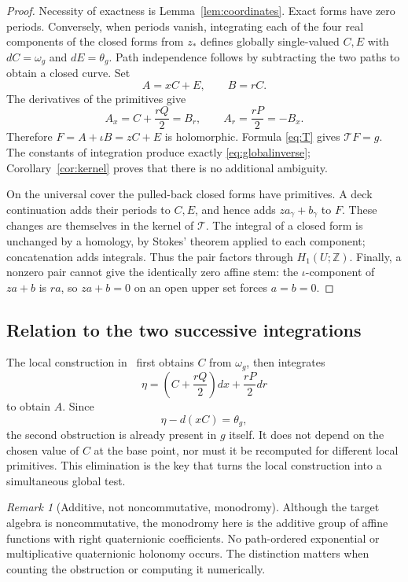 \documentclass[11pt,a4paper]{article}
\numberwithin{equation}{section}
\theoremstyle{definition}
\theoremstyle{remark}
\newtheorem{remark}[theorem]{Remark}
\newcommand{\T}{\mathcal T}
\begin{document}
\begin{proof}
Necessity of exactness is Lemma~\ref{lem:coordinates}. Exact forms have zero
periods. Conversely, when periods vanish, integrating each of the four real
components of the closed forms from $z_*$ defines globally single-valued
$C,E$ with $dC=\omega_g$ and $dE=\theta_g$. Path independence follows by
subtracting the two paths to obtain a closed curve. Set
\[
 A=xC+E,\qquad B=rC.
\]
The derivatives of the primitives give
\[
 A_x=C+\frac{rQ}{2}=B_r,\qquad
 A_r=\frac{rP}{2}=-B_x.
\]
Therefore $F=A+\iota B=zC+E$ is holomorphic. Formula \eqref{eq:T} gives
$\T F=g$. The constants of integration produce exactly
\eqref{eq:globalinverse}; Corollary~\ref{cor:kernel} proves that there is
no additional ambiguity.

On the universal cover the pulled-back closed forms have primitives. A deck
continuation adds their periods to $C,E$, and hence adds
$za_\gamma+b_\gamma$ to $F$. These changes are themselves in the kernel
of $\T$. The integral of a closed form is unchanged by a homology, by
Stokes' theorem applied to each component; concatenation adds integrals.
Thus the pair factors through $H_1(U;\mathbb Z)$. Finally, a nonzero pair
cannot give the identically zero affine stem: the $\iota$-component of
$za+b$ is $ra$, so $za+b=0$ on an open upper set forces $a=b=0$.
\end{proof}

\subsection{Relation to the two successive integrations}
The local construction in~\cite{Source} first obtains $C$ from $\omega_g$,
then integrates
\[
 \eta=\left(C+\frac{rQ}{2}\right)dx+\frac{rP}{2}dr
\]
to obtain $A$. Since
\begin{equation}
 \eta-d(xC)=\theta_g,
 \label{eq:eliminateC}
\end{equation}
the second obstruction is already present in $g$ itself. It does not depend
on the chosen value of $C$ at the base point, nor must it be recomputed
for different local primitives. This elimination is the key that turns the
local construction into a simultaneous global test.

\begin{remark}[Additive, not noncommutative, monodromy]
Although the target algebra is noncommutative, the monodromy here is the
additive group of affine functions with right quaternionic coefficients.
No path-ordered exponential or multiplicative quaternionic holonomy occurs.
The distinction matters when counting the obstruction or computing it
numerically.
\end{remark}
\end{document}
